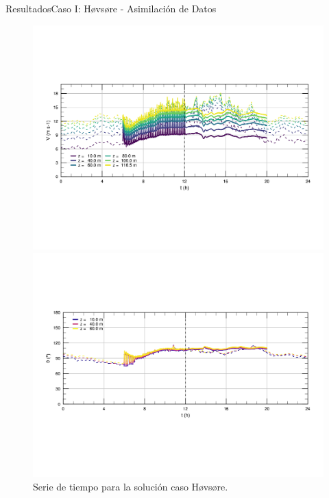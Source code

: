 \documentclass[mathserif,10pt]{beamer}
\begin{document}
\begin{frame}{Resultados}{Caso I: Høvsøre - Asimilación de Datos}
	\begin{figure}[H]
		\centering
		\includegraphics[width=0.85\linewidth,trim={9mm 63mm 10mm 55mm},clip]{fig/06/hov_da/ts_v}%
		
		\includegraphics[width=0.85\linewidth,trim={12mm 55mm 10mm 55mm},clip]{fig/06/hov_da/ts_o}%
		\vspace{-4mm}
		\caption{Serie de tiempo para la solución caso Høvsøre.}
		\label{fig:06_hov_da_ts}
	\end{figure}
\end{frame}
\end{document}
